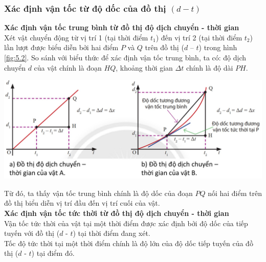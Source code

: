 \subsubsection{Xác định vận tốc từ độ dốc của đồ thị $\left(d-t\right)$}
\textbf{Xác định vận tốc trung bình từ đồ thị độ dịch chuyển - thời gian}\\
Xét vật chuyển động từ vị trí 1 (tại thời điểm $t_1$) đến vị trí 2 (tại thời điểm $t_2$) lần lượt được biểu diễn bởi hai điểm $P$ và $Q$ trên đồ thị ($d$ – $t$) trong hình \ref{fig:5.2}. So sánh với biểu thức để xác định vận tốc trung bình, ta có: độ dịch chuyển $d$ của vật chính là đoạn $HQ$, khoảng thời gian $\Delta t$ chính là độ dài $PH$.\\
\begin{center}
	\includegraphics[width=0.8\linewidth]{../figs/VN10-2023-PH-TP005-2}
	\label{fig:5.2}
\end{center}
Từ đó, ta thấy vận tốc trung bình chính là độ dốc của đoạn $PQ$ nối hai điểm trên đồ thị biểu diễn vị trí đầu đến vị trí cuối của vật.\\
\textbf{Xác định vận tốc tức thời từ đồ thị độ dịch chuyển - thời gian}\\
Vận tốc tức thời của vật tại một thời điểm được xác định bởi độ dốc của tiếp tuyến với đồ thị ($d$ - $t$) tại thời điểm đang xét.\\
Tốc độ tức thời tại một thời điểm chính là độ lớn của độ dốc tiếp tuyến của đồ thị ($d$ - $t$) tại điểm đó.
